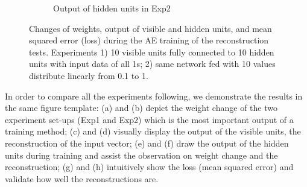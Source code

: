 \begin{figure}
\begin{subfigure}[t]{0.45\textwidth}
		\caption{Output of hidden units in Exp2}
	\end{subfigure}
	\caption{Changes of weights, output of visible and hidden units, and mean squared error (loss) during the AE training of the reconstruction tests. 
		Experiments 1) 10 visible units fully connected to 10 hidden units with input data of all 1s; 2) same network fed with 10 values distribute linearly from 0.1 to 1.}
	\label{fig:ae_orig}
\end{figure}

In order to compare all the experiments following, we demonstrate the results in the same figure template:
(a) and (b) depict the weight change of the two experiment set-ups (Exp1 and Exp2) which is the most important output of a training method;
(c) and (d) visually display the output of the visible units, the reconstruction of the input vector;
(e) and (f) draw the output of the hidden units during training and assist the observation on weight change and the reconstruction;
(g) and (h) intuitively show the loss (mean squared error) and validate how well the reconstructions are.


